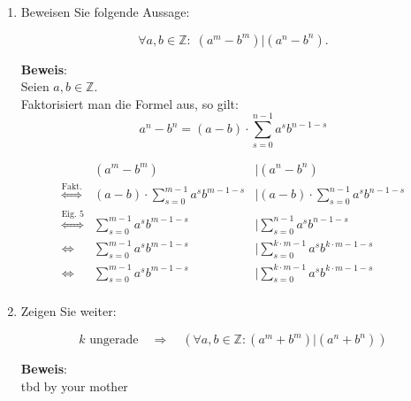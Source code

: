 \documentclass[11pt,a4paper,ngerman]{article}
\newcommand{\Z}{\mathbb{Z}}
\begin{document}
\begin{enumerate}[\bfseries a)]

\item Beweisen Sie folgende Aussage:

$$\forall a,b \in \Z : \; (a^m - b^m) | (a^n - b^n).$$



\textbf{Beweis}: \\
Seien $a,b\in \Z$.\\
Faktorisiert man die Formel aus, so gilt:\\
$$a^n - b^n = \left( a - b \right) \cdot \sum_{s=0}^{n-1} a^s b^{n-1-s}$$

$$\begin{array}{crl}
&\left(a^m - b^m \right)&|\left( a^n - b^n \right) \\
\stackrel{\text{Fakt.}}{\Leftrightarrow} &  \left( a - b \right) \cdot \sum_{s=0}^{m-1} a^s b^{m-1-s}  &|    \left( a - b \right) \cdot \sum_{s=0}^{n-1} a^s b^{n-1-s}\\
\stackrel{\text{Eig. 5}}{\Leftrightarrow} &  \sum_{s=0}^{m-1} a^s b^{m-1-s}  &|    \sum_{s=0}^{n-1} a^s b^{n-1-s}\\
\Leftrightarrow &  \sum_{s=0}^{m-1} a^s b^{m-1-s}  &|    \sum_{s=0}^{k\cdot m-1} a^s b^{k \cdot m-1-s}\\
\Leftrightarrow &  \sum_{s=0}^{m-1} a^s b^{m-1-s}  &|    \sum_{s=0}^{k\cdot m-1} a^s b^{k \cdot m-1-s}\\
\end{array}$$

\item Zeigen Sie weiter:

$$ k \text{ ungerade} \quad \Rightarrow \quad (\forall a,b \in \Z : (a^m + b^m) | (a^n + b^n))$$


\textbf{Beweis}: \\

tbd by your mother

\end{enumerate}



\end{document}

